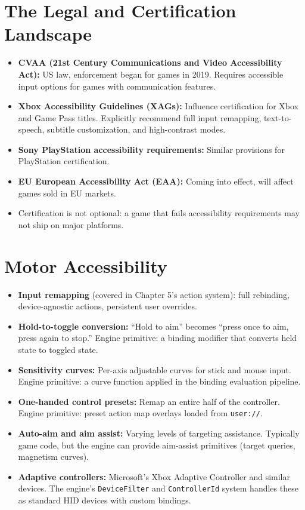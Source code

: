 \documentclass[
  11pt,
  letterpaper,
  DIV=11,
  numbers=noendperiod,
  twoside,
  open=right]{scrreprt}
\providecommand{\tightlist}{%
  \setlength{\itemsep}{0pt}\setlength{\parskip}{0pt}}
\begin{document}
\section{The Legal and Certification
Landscape}\label{the-legal-and-certification-landscape}

\begin{itemize}
\tightlist
\item
  \textbf{CVAA (21st Century Communications and Video Accessibility
  Act):} US law, enforcement began for games in 2019. Requires
  accessible input options for games with communication features.
\item
  \textbf{Xbox Accessibility Guidelines (XAGs):} Influence certification
  for Xbox and Game Pass titles. Explicitly recommend full input
  remapping, text-to-speech, subtitle customization, and high-contrast
  modes.
\item
  \textbf{Sony PlayStation accessibility requirements:} Similar
  provisions for PlayStation certification.
\item
  \textbf{EU European Accessibility Act (EAA):} Coming into effect, will
  affect games sold in EU markets.
\item
  Certification is not optional: a game that fails accessibility
  requirements may not ship on major platforms.
\end{itemize}

\section{Motor Accessibility}\label{motor-accessibility}

\begin{itemize}
\tightlist
\item
  \textbf{Input remapping} (covered in Chapter 5's action system): full
  rebinding, device-agnostic actions, persistent user overrides.
\item
  \textbf{Hold-to-toggle conversion:} ``Hold to aim'' becomes ``press
  once to aim, press again to stop.'' Engine primitive: a binding
  modifier that converts held state to toggled state.
\item
  \textbf{Sensitivity curves:} Per-axis adjustable curves for stick and
  mouse input. Engine primitive: a curve function applied in the binding
  evaluation pipeline.
\item
  \textbf{One-handed control presets:} Remap an entire half of the
  controller. Engine primitive: preset action map overlays loaded from
  \texttt{user://}.
\item
  \textbf{Auto-aim and aim assist:} Varying levels of targeting
  assistance. Typically game code, but the engine can provide aim-assist
  primitives (target queries, magnetism curves).
\item
  \textbf{Adaptive controllers:} Microsoft's Xbox Adaptive Controller
  and similar devices. The engine's \texttt{DeviceFilter} and
  \texttt{ControllerId} system handles these as standard HID devices
  with custom bindings.
\end{itemize}
\end{document}
